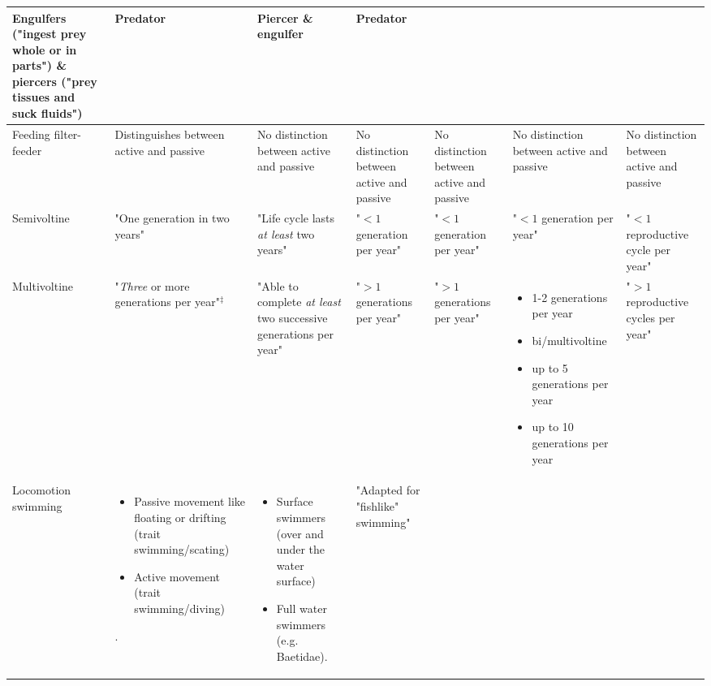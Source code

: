 \documentclass[12pt]{article}
\begin{document}
\begin{landscape}
\begin{longtable}{m{1.9cm}|m{3.3cm}|m{3.3cm}|m{2.7cm}|m{3cm}|m{3.2cm}|m{2.5cm}}
        Engulfers ("ingest prey whole or in parts") \& 
        piercers ("prey tissues and suck fluids") & 
        Predator &
        Piercer \& engulfer &
        Predator
        \\ 
        \midrule
        Feeding filter-feeder & 
        Distinguishes between active and passive &
        No distinction between active and passive &
        No distinction between active and passive &
        No distinction between active and passive &
        No distinction between active and passive &
        No distinction between active and passive
        \\
        \toprule[.1em]
        Semivoltine & 
        "One generation in two years" & 
        "Life cycle lasts \textit{at least} two years" & 
        "$< 1$ generation per year" & 
        "$< 1$ generation per year" & 
        "$< 1$ generation per year" & 
        "$< 1$ reproductive cycle per year"
        \\
        \midrule
        Multi\-voltine & 
        "\textit{Three} or more generations per year"$^{\ddagger}$ & 
        "Able to complete \textit{at least} two successive generations per year" &
        "$> 1$ generations per year" &
        "$> 1$ generations per year" & 
        \begin{itemize}
            \item 1-2 generations per year
            \item bi/multivoltine
            \item up to 5 generations per year
            \item up to 10 generations per year
        \end{itemize}
        & 
        "$> 1$ reproductive cycles per year"
        \\
        \toprule[.1em]
        Locomotion swimming & 
        \begin{itemize}
            \item Passive movement like floating or drifting (trait swimming/scating)
            \item Active movement (trait swimming/diving)
        \end{itemize}. &
        \begin{itemize}
            \item Surface swimmers (over and under the water surface)
            \item Full water swimmers (e.g. Baetidae).
        \end{itemize} & 
        "Adapted for "fishlike" swimming" & 

\end{longtable}
\end{landscape}
\end{document}
